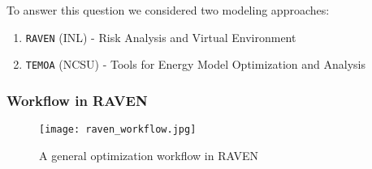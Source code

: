 \begin{frame}
    To answer this question we considered two modeling approaches:
    \begin{enumerate}
      \item \texttt{RAVEN} (INL) - Risk Analysis and Virtual Environment \cite{baker_optimal_2018}\cite{epiney_report_2017}
      \item \texttt{TEMOA} (NCSU) - Tools for Energy Model Optimization and Analysis \cite{decarolis_temoa_2010}\cite{decarolis_modelling_2016}
    \end{enumerate}
\end{frame}

\begin{frame}
  \frametitle{Workflow in RAVEN}
  \begin{figure}
    \texttt{[image: raven\_workflow.jpg]}
    \caption{A general optimization workflow in RAVEN}
    \label{fig:workflow}
  \end{figure}
\end{frame}
